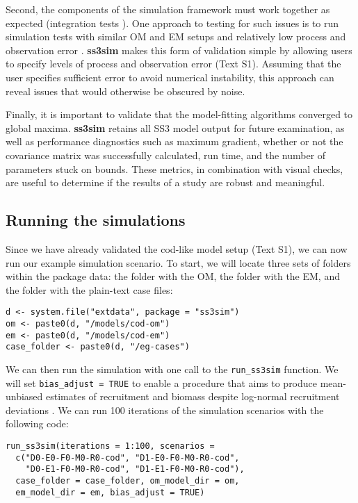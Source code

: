 Second, the components of the simulation framework must work together as
expected (integration tests \cite{wilson2014}). One approach to testing for
such issues is to run simulation tests with similar OM and EM setups and
relatively low process and observation error \cite{hilborn1992}.
\textbf{ss3sim} makes this form of validation simple by allowing users to
specify levels of process and observation error (Text S1). Assuming
that the user specifies sufficient error to avoid numerical instability, this
approach can reveal issues that would otherwise be obscured by noise.

Finally, it is important to validate that the model-fitting algorithms
converged to global maxima. \textbf{ss3sim} retains all SS3 model output for
future examination, as well as performance diagnostics such as maximum
gradient, whether or not the covariance matrix was successfully calculated, run
time, and the number of parameters stuck on bounds. These metrics, in
combination with visual checks, are useful to determine if the results of a
study are robust and meaningful.

\subsection*{Running the simulations}

Since we have already validated the cod-like model setup (Text S1), we can now
run our example simulation scenario. To start, we will locate three sets of
folders within the package data: the folder with the OM, the folder with the
EM, and the folder with the plain-text case files:

\begin{verbatim}
d <- system.file("extdata", package = "ss3sim")
om <- paste0(d, "/models/cod-om")
em <- paste0(d, "/models/cod-em")
case_folder <- paste0(d, "/eg-cases")
\end{verbatim}

We can then run the simulation with one call to the \texttt{run\_ss3sim}
function. We will set \texttt{bias\_adjust = TRUE} to enable a procedure that
aims to produce mean-unbiased estimates of recruitment and biomass despite
log-normal recruitment deviations \cite{methot2011}. We can run 100 iterations
of the simulation scenarios with the following code:

\begin{verbatim}
run_ss3sim(iterations = 1:100, scenarios =
  c("D0-E0-F0-M0-R0-cod", "D1-E0-F0-M0-R0-cod",
    "D0-E1-F0-M0-R0-cod", "D1-E1-F0-M0-R0-cod"),
  case_folder = case_folder, om_model_dir = om,
  em_model_dir = em, bias_adjust = TRUE)
\end{verbatim}

